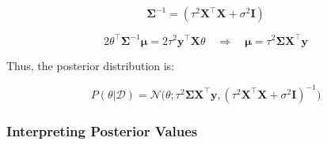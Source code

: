 \[
    \boldsymbol{\Sigma}^{-1}=(\tau^2\boldsymbol{X}^\top\boldsymbol{X}+\sigma^2\mathbf{I})
\]

\[
    2\theta^\top\boldsymbol{\Sigma}^{-1}\boldsymbol{\mu}=2\tau^2\boldsymbol{y}^\top\boldsymbol{X}\theta \quad\Rightarrow\quad\boldsymbol{\mu}=\tau^2\boldsymbol{\Sigma}\boldsymbol{X}^\top\boldsymbol{y}
\]

Thus, the posterior distribution is:

\[
    P(\theta|\mathcal{D}) = \mathcal{N}\big(\theta;\tau^2\boldsymbol{\Sigma}\boldsymbol{X}^\top\boldsymbol{y},(\tau^2\boldsymbol{X}^\top\boldsymbol{X}+\sigma^2\mathbf{I})^{-1}\big)
\]

\pagebreak\subsubsection{Interpreting Posterior Values}

